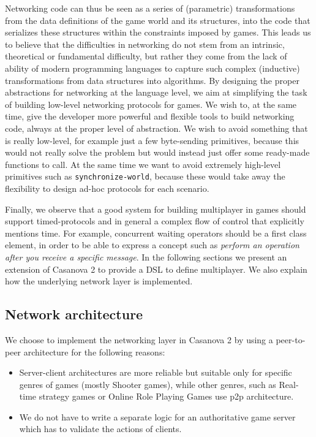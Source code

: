 Networking code can thus be seen as a series of (parametric) transformations from the data definitions of the game world and its structures, into the code that serializes these structures within the constraints imposed by games. This leads us to believe that the difficulties in networking do not stem from an intrinsic, theoretical or fundamental difficulty, but rather they come from the lack of ability of modern programming languages to capture such complex (inductive) transformations from data structures into algorithms. By designing the proper abstractions for networking at the language level, we aim at simplifying the task of building low-level networking protocols for games. We wish to, at the same time, give the developer more powerful and flexible tools to build networking code, always at the proper level of abstraction. We wish to avoid something that is really low-level, for example just a few byte-sending primitives, because this would not really solve the problem but would instead just offer some ready-made functions to call. At the same time we want to avoid extremely high-level primitives such as \texttt{synchronize-world}, because these would take away the flexibility to design ad-hoc protocols for each scenario. 

Finally, we observe that a good system for building multiplayer in games should support timed-protocols and in general a complex flow of control that explicitly mentions time. For example, concurrent waiting operators should be a first class element, in order to be able to express a concept such as \textit{perform an operation after you receive a specific message}. In the following sections we present an extension of Casanova 2 to provide a DSL to define multiplayer. We also explain how the underlying network layer is implemented.

\subsection*{Network architecture}
We choose to implement the networking layer in Casanova 2 by using a peer-to-peer architecture for the following reasons:

\begin{itemize}
	\item Server-client architectures are more reliable but suitable only for specific genres of games (mostly Shooter games), while other genres, such as Real-time strategy games or Online Role Playing Games use p2p architecture.
	\item We do not have to write a separate logic for an authoritative game server which has to validate the actions of clients.
\end{itemize}

